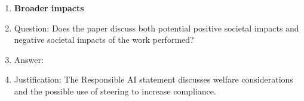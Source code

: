 \documentclass{article}
\begin{document}
\begin{enumerate}
\item {\bf Broader impacts}
    \item[] Question: Does the paper discuss both potential positive societal impacts and negative societal impacts of the work performed?
    \item[] Answer: \answerYes{}
    \item[] Justification: The Responsible AI statement discusses welfare considerations and the possible use of steering to increase compliance.

\end{enumerate}
\fi
\end{document}

